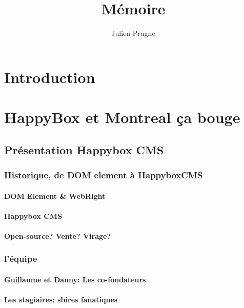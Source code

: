 \documentclass[11pt, a4paper ]{report}
\title{Mémoire}
\author{Julien Prugne}
\begin{document}
	\maketitle
	\tableofcontents

	\chapter*{Introduction} %

	\chapter{HappyBox et Montreal ça bouge} %

		\section{Présentation Happybox CMS} %
			\subsection{Historique, de DOM element à HappyboxCMS}
				\subsubsection{DOM Element & WebRight}

				\subsubsection{Happybox CMS}

				\subsubsection{Open-source? Vente? Virage?}

			\subsection{l'équipe}


				\subsubsection{Guillaume et Danny: Les co-fondateurs}

				\subsubsection{Les stagiaires: sbires fanatiques}
\end{document}
